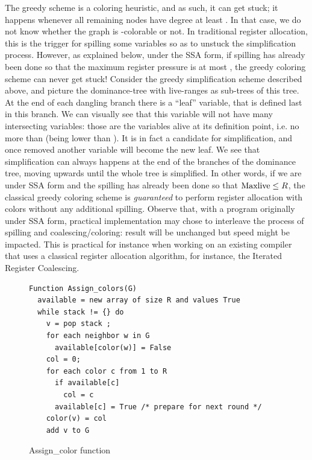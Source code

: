 {The greedy scheme is a coloring heuristic, and as such, it can get stuck;
it happens whenever all remaining nodes have degree at least \regs.
In that case, we do not know whether the graph is \regs-colorable or not.
In traditional register allocation, this is the trigger for spilling some variables so as to unstuck the simplification process.
However, as explained below, under the SSA form, if spilling has already been done so that the maximum register pressure is at most \regs, the greedy coloring scheme can never get stuck!
Consider the greedy simplification scheme described above, and picture the dominance-tree with live-ranges as sub-trees of this tree.
At the end of each dangling branch there is a ``leaf'' variable, that is defined last in this branch.
We can visually see that this variable will not have many intersecting variables:
those are the variables alive at its definition point, i.e. no more than  (\maxlive being lower than \regs).
It is in fact a candidate for simplification, and once removed another variable will become the new leaf.
We see that simplification can always happens at the end of the branches of the dominance tree, moving upwards until the whole tree is simplified.
In other words, if we are under SSA form and the spilling has already been done so that $\mathrm{Maxlive} \leq R$, the classical greedy coloring scheme is \emph{guaranteed} to perform register allocation with \regs colors without any additional spilling.
Observe that, with a program originally under SSA form, practical implementation may chose to interleave the process of spilling and coalescing/coloring:
result will be unchanged but speed might be impacted.
This is practical for instance when working on an existing compiler that uses a classical register allocation algorithm, for instance, the Iterated Register Coalescing.



\begin{figure}
\begin{verbatim}
Function Assign_colors(G)
  available = new array of size R and values True
  while stack != {} do
    v = pop stack ;
    for each neighbor w in G
      available[color(w)] = False
    col = 0;
    for each color c from 1 to R
      if available[c]
        col = c
      available[c] = True /* prepare for next round */
    color(v) = col
    add v to G
\end{verbatim}
\caption{Assign\_color function}
\label{code:assign-color}
\end{figure}


}
